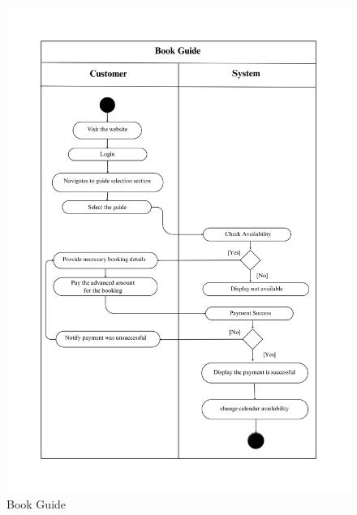 \begin{figure}[h]
    \centering
    \includegraphics[width=1\textwidth]{Images/Activity Diagrams/24 Book Guide.png}
    \caption{Book Guide}
    \label{fig:activity-book-guide}
\end{figure}


